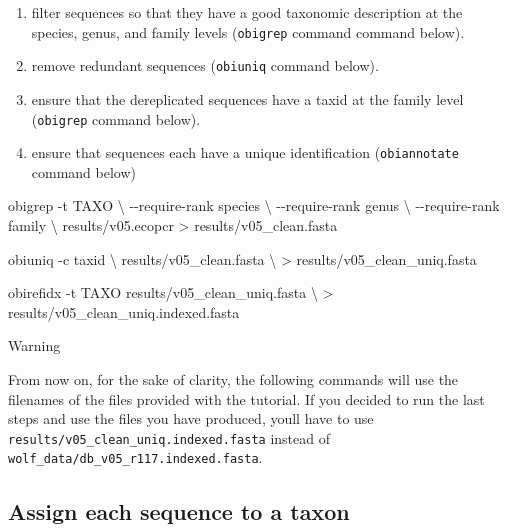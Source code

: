 \documentclass[
  letterpaper,
  DIV=11,
  numbers=noendperiod]{scrreprt}
\newenvironment{Shaded}{\begin{snugshade}}{\end{snugshade}}
\newcommand{\AttributeTok}[1]{\textcolor[rgb]{0.40,0.45,0.13}{#1}}
\newcommand{\DataTypeTok}[1]{\textcolor[rgb]{0.68,0.00,0.00}{#1}}
\newcommand{\ExtensionTok}[1]{\textcolor[rgb]{0.00,0.23,0.31}{#1}}
\newcommand{\NormalTok}[1]{\textcolor[rgb]{0.00,0.23,0.31}{#1}}
\newcommand{\OperatorTok}[1]{\textcolor[rgb]{0.37,0.37,0.37}{#1}}
\providecommand{\tightlist}{%
  \setlength{\itemsep}{0pt}\setlength{\parskip}{0pt}}\usepackage{longtable,booktabs,array}
\begin{document}
\begin{enumerate}
\def\labelenumi{\arabic{enumi}.}
\tightlist
\item
  filter sequences so that they have a good taxonomic description at the
  species, genus, and family levels (\texttt{obigrep} command command
  below).
\item
  remove redundant sequences (\texttt{obiuniq} command below).
\item
  ensure that the dereplicated sequences have a taxid at the family
  level (\texttt{obigrep} command below).
\item
  ensure that sequences each have a unique identification
  (\texttt{obiannotate} command below)
\end{enumerate}

\begin{Shaded}
\begin{Highlighting}[]
\ExtensionTok{obigrep} \AttributeTok{{-}t}\NormalTok{ TAXO }\DataTypeTok{\textbackslash{}}
          \AttributeTok{{-}{-}require{-}rank}\NormalTok{ species }\DataTypeTok{\textbackslash{}}
          \AttributeTok{{-}{-}require{-}rank}\NormalTok{ genus }\DataTypeTok{\textbackslash{}}
          \AttributeTok{{-}{-}require{-}rank}\NormalTok{ family }\DataTypeTok{\textbackslash{}}
\NormalTok{          results/v05.ecopcr }\OperatorTok{\textgreater{}}\NormalTok{ results/v05\_clean.fasta}

\ExtensionTok{obiuniq} \AttributeTok{{-}c}\NormalTok{ taxid }\DataTypeTok{\textbackslash{}}
\NormalTok{        results/v05\_clean.fasta }\DataTypeTok{\textbackslash{}}
        \OperatorTok{\textgreater{}}\NormalTok{ results/v05\_clean\_uniq.fasta}

\ExtensionTok{obirefidx} \AttributeTok{{-}t}\NormalTok{ TAXO results/v05\_clean\_uniq.fasta }\DataTypeTok{\textbackslash{}}
        \OperatorTok{\textgreater{}}\NormalTok{ results/v05\_clean\_uniq.indexed.fasta}
\end{Highlighting}
\end{Shaded}

Warning

From now on, for the sake of clarity, the following commands will use
the filenames of the files provided with the tutorial. If you decided to
run the last steps and use the files you have produced,
you\textquotesingle ll have to use
\texttt{results/v05\_clean\_uniq.indexed.fasta} instead of
\texttt{wolf\_data/db\_v05\_r117.indexed.fasta}.

\hypertarget{assign-each-sequence-to-a-taxon}{%
\subsection{Assign each sequence to a
taxon}\label{assign-each-sequence-to-a-taxon}}
\end{document}
